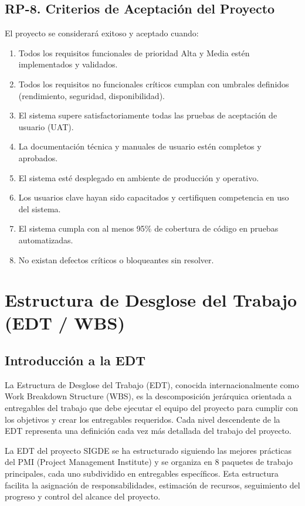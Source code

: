 \documentclass[12pt,a4paper]{article}
\begin{document}
\subsection{RP-8. Criterios de Aceptación del Proyecto}

El proyecto se considerará exitoso y aceptado cuando:

\begin{enumerate}[noitemsep]
    \item Todos los requisitos funcionales de prioridad Alta y Media estén implementados y validados.
    \item Todos los requisitos no funcionales críticos cumplan con umbrales definidos (rendimiento, seguridad, disponibilidad).
    \item El sistema supere satisfactoriamente todas las pruebas de aceptación de usuario (UAT).
    \item La documentación técnica y manuales de usuario estén completos y aprobados.
    \item El sistema esté desplegado en ambiente de producción y operativo.
    \item Los usuarios clave hayan sido capacitados y certifiquen competencia en uso del sistema.
    \item El sistema cumpla con al menos 95\% de cobertura de código en pruebas automatizadas.
    \item No existan defectos críticos o bloqueantes sin resolver.
\end{enumerate}

\newpage

\section{Estructura de Desglose del Trabajo (EDT / WBS)}

\subsection{Introducción a la EDT}

La Estructura de Desglose del Trabajo (EDT), conocida internacionalmente como Work Breakdown Structure (WBS), es la descomposición jerárquica orientada a entregables del trabajo que debe ejecutar el equipo del proyecto para cumplir con los objetivos y crear los entregables requeridos. Cada nivel descendente de la EDT representa una definición cada vez más detallada del trabajo del proyecto.

La EDT del proyecto SIGDE se ha estructurado siguiendo las mejores prácticas del PMI (Project Management Institute) y se organiza en 8 paquetes de trabajo principales, cada uno subdividido en entregables específicos. Esta estructura facilita la asignación de responsabilidades, estimación de recursos, seguimiento del progreso y control del alcance del proyecto.
\end{document}
